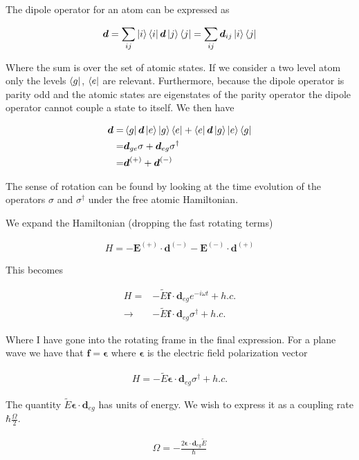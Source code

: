 \documentclass[12pt]{article}
\newcommand{\ep}{\epsilon}
\renewcommand{\vec}[1]{\boldsymbol{#1}}
\begin{document}
The dipole operator for an atom can be expressed as

\begin{align}
\vec{d} = \sum_{ij} \ket{i}\bra{i}\vec{d}\ket{j}\bra{j} = \sum_{ij} \vec{d}_{ij} \ket{i}\bra{j}
\end{align}

Where the sum is over the set of atomic states.
If we consider a two level atom only the levels $\bra{g}$, $\bra{e}$ are relevant.
Furthermore, because the dipole operator is parity odd and the atomic states are eigenstates of the parity operator the dipole operator cannot couple a state to itself. We then have

\begin{align}
\vec{d} =& \bra{g}\vec{d}\ket{e} \ket{g}\bra{e} + \bra{e}\vec{d}\ket{g} \ket{e}\bra{g}\\
=& \vec{d}_{ge} \sigma + \vec{d}_{eg} \sigma^{\dag}\\
=& \vec{d}^{(+)} + \vec{d}^{(-)}
\end{align}

The sense of rotation can be found by looking at the time evolution of the operators $\sigma$ and $\sigma^{\dag}$ under the free atomic Hamiltonian.

We expand the Hamiltonian (dropping the fast rotating terms)

\begin{align}
H = - \vec{E}^{(+)}\cdot \vec{d}^{(-)} - \vec{E}^{(-)}\cdot\vec{d}^{(+)}
\end{align}

This becomes

\begin{align}
H =& - \tilde{E}\vec{f}\cdot\vec{d}_{eg} e^{-i\omega t} + h.c.\\
\rightarrow &- \tilde{E}\vec{f}\cdot\vec{d}_{eg}\sigma^{\dag} + h.c.
\end{align}

Where I have gone into the rotating frame in the final expression.
For a plane wave we have that $\vec{f} = \vec{\ep}$ where $\vec{\ep}$ is the electric field polarization vector

\begin{align}
H = -\tilde{E}\vec{\ep}\cdot\vec{d}_{eg} \sigma^{\dag} + h.c.
\end{align}

The quantity $\tilde{E} \vec{\ep}\cdot\vec{d}_{eg}$ has units of energy.
We wish to express it as a coupling rate $\hbar\frac{\Omega}{2}$.

\begin{align}
\Omega = -\frac{2 \vec{\ep}\cdot \vec{d}_{eg} \tilde{E}}{\hbar}
\end{align}
\end{document}
